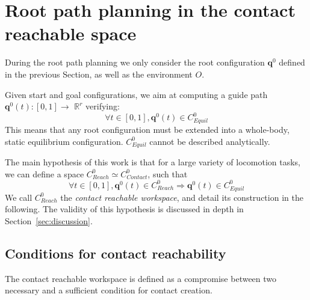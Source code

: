 \section{Root path planning in the contact reachable space}
\label{rbprm}

During the root path planning we only consider the root configuration $\mathbf{q}^0$ defined in the previous Section,
as well as the environment $O$.

Given start and goal configurations, we aim at computing a guide path $\mathbf{q}^0(t) : [0,1] \longrightarrow$ $\mathbb{R}^r$ verifying:
\begin{equation*} \label{eq:path}
\forall t \in [0,1], \mathbf{q}^0(t)  \in C_{Equil}^0
\end{equation*}
This means that any root configuration must be extended into a whole-body, static equilibrium configuration.
$C_{Equil}^0$  cannot be described analytically.

The main hypothesis of this work is that for a large variety of locomotion tasks, we can define a space  $C_{Reach}^0 \simeq C_{Contact}^0$, such that 
\begin{equation} \label{eq:creach}
\forall t \in [0,1], \mathbf{q}^0(t) \in C_{Reach}^0 \Rightarrow \mathbf{q}^0(t)  \in C_{Equil}^0
\end{equation}
We call  $C_{Reach}^0$ the \textit{contact reachable workspace}, and detail its construction in the following.
The validity of this hypothesis is discussed in depth in Section~\ref{sec:discussion}.
 
\subsection{Conditions for contact reachability}
The contact reachable workspace is defined as a compromise between two necessary and a sufficient condition for contact creation.

